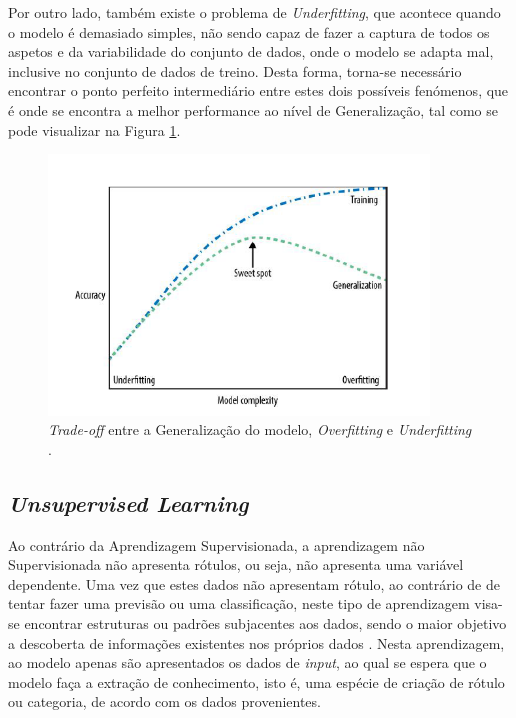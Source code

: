 \documentclass[12pt,a4paper,twoside]{report}
\begin{document}
{Por outro lado, também existe o problema de \textit{Underfitting}, que acontece quando o modelo é demasiado simples, não sendo capaz de fazer a captura de todos os aspetos e da variabilidade do conjunto de dados, onde o modelo se adapta mal, inclusive no conjunto de dados de treino. Desta forma, torna-se necessário encontrar o ponto perfeito intermediário entre estes dois possíveis fenómenos, que é onde se encontra a melhor performance ao nível de Generalização, tal como se pode visualizar na Figura \ref{fig:tradeoff}.


\begin{figure}[H]
    \centering
    \includegraphics[width=0.9\textwidth]{imagens/tradeoffmodel.png}
    \caption{\textit{Trade-off} entre a Generalização do modelo, \textit{Overfitting} e \textit{Underfitting} \cite{müller2016introduction}.}
    \label{fig:tradeoff}
\end{figure}


\subsection{\textit{Unsupervised Learning}}

Ao contrário da Aprendizagem Supervisionada, a aprendizagem não Supervisionada não apresenta rótulos, ou seja, não apresenta uma variável dependente. Uma vez que estes dados não apresentam rótulo, ao contrário de de tentar fazer uma previsão ou uma classificação, neste tipo de aprendizagem visa-se encontrar estruturas ou padrões subjacentes aos dados, sendo o maior objetivo a descoberta de informações existentes nos próprios dados \cite{10.1007/s42979-021-00592-x}. Nesta aprendizagem, ao modelo apenas são apresentados os dados de \textit{input}, ao qual se espera que o modelo faça a extração de conhecimento, isto é, uma espécie de criação de rótulo ou categoria, de acordo com os dados provenientes.

}
\end{document}
